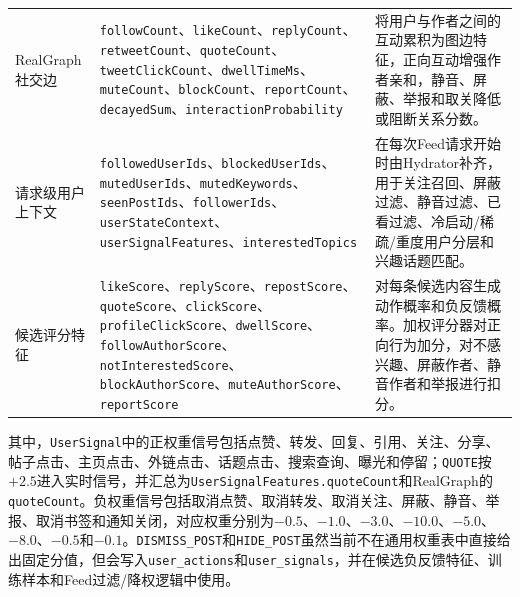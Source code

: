 \begin{longtable}{L{0.17\textwidth}L{0.33\textwidth}L{0.39\textwidth}}
  RealGraph社交边 & \texttt{followCount}、\texttt{likeCount}、\texttt{replyCount}、\texttt{retweetCount}、\texttt{quoteCount}、\texttt{tweetClickCount}、\texttt{dwellTimeMs}、\texttt{muteCount}、\texttt{blockCount}、\texttt{reportCount}、\texttt{decayedSum}、\texttt{interactionProbability}               & 将用户与作者之间的互动累积为图边特征，正向互动增强作者亲和，静音、屏蔽、举报和取关降低或阻断关系分数。                 \\
  请求级用户上下文     & \texttt{followedUserIds}、\texttt{blockedUserIds}、\texttt{mutedUserIds}、\texttt{mutedKeywords}、\texttt{seenPostIds}、\texttt{followerIds}、\texttt{userStateContext}、\texttt{userSignalFeatures}、\texttt{interestedTopics}                                                           & 在每次Feed请求开始时由Hydrator补齐，用于关注召回、屏蔽过滤、静音过滤、已看过滤、冷启动/稀疏/重度用户分层和兴趣话题匹配。 \\
  候选评分特征       & \texttt{likeScore}、\texttt{replyScore}、\texttt{repostScore}、\texttt{quoteScore}、\texttt{clickScore}、\texttt{profileClickScore}、\texttt{dwellScore}、\texttt{followAuthorScore}、\texttt{notInterestedScore}、\texttt{blockAuthorScore}、\texttt{muteAuthorScore}、\texttt{reportScore} & 对每条候选内容生成动作概率和负反馈概率。加权评分器对正向行为加分，对不感兴趣、屏蔽作者、静音作者和举报进行扣分。            \\
  \bottomrule
\end{longtable}
\endgroup

其中，\texttt{UserSignal}中的正权重信号包括点赞、转发、回复、引用、关注、分享、帖子点击、主页点击、外链点击、话题点击、搜索查询、曝光和停留；\texttt{QUOTE}按$+2.5$进入实时信号，并汇总为\texttt{UserSignalFeatures.quoteCount}和RealGraph的\texttt{quoteCount}。负权重信号包括取消点赞、取消转发、取消关注、屏蔽、静音、举报、取消书签和通知关闭，对应权重分别为$-0.5$、$-1.0$、$-3.0$、$-10.0$、$-5.0$、$-8.0$、$-0.5$和$-0.1$。\texttt{DISMISS\_POST}和\texttt{HIDE\_POST}虽然当前不在通用权重表中直接给出固定分值，但会写入\texttt{user\_actions}和\texttt{user\_signals}，并在候选负反馈特征、训练样本和Feed过滤/降权逻辑中使用。

